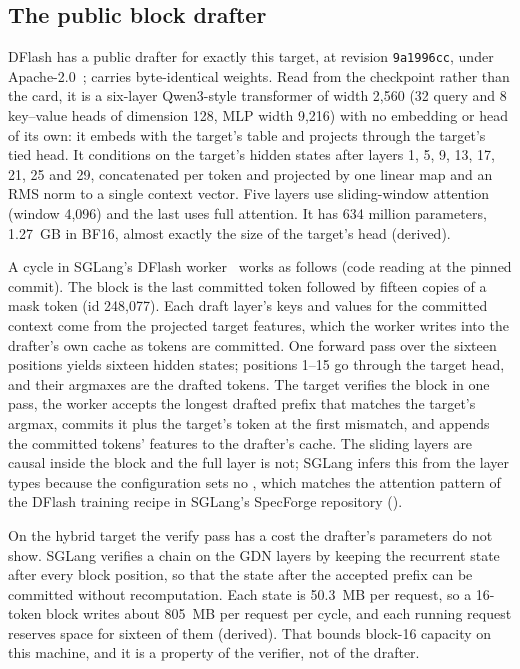 \subsection{The public block drafter}\label{app:drafter-model}\label{sec:drafter-model}
DFlash has a public drafter for exactly this target,  at revision \texttt{9a1996cc}, under Apache-2.0~\cite{dflashpaper,dflash4bcard};  carries byte-identical weights. Read from the checkpoint rather than the card, it is a six-layer Qwen3-style transformer of width 2,560 (32 query and 8 key--value heads of dimension 128, MLP width 9,216) with no embedding or head of its own: it embeds with the target's table and projects through the target's tied head. It conditions on the target's hidden states after layers 1, 5, 9, 13, 17, 21, 25 and 29, concatenated per token and projected by one linear map and an RMS norm to a single context vector. Five layers use sliding-window attention (window 4,096) and the last uses full attention. It has 634 million parameters, 1.27~GB in BF16, almost exactly the size of the target's head (derived).

A cycle in SGLang's DFlash worker~\cite{sgdflashworker,sgcode} works as follows (code reading at the pinned commit). The block is the last committed token followed by fifteen copies of a mask token (id 248,077). Each draft layer's keys and values for the committed context come from the projected target features, which the worker writes into the drafter's own cache as tokens are committed. One forward pass over the sixteen positions yields sixteen hidden states; positions 1--15 go through the target head, and their argmaxes are the drafted tokens. The target verifies the block in one pass, the worker accepts the longest drafted prefix that matches the target's argmax, commits it plus the target's token at the first mismatch, and appends the committed tokens' features to the drafter's cache. The sliding layers are causal inside the block and the full layer is not; SGLang infers this from the layer types because the configuration sets no , which matches the attention pattern of the DFlash training recipe in SGLang's SpecForge repository ().

On the hybrid target the verify pass has a cost the drafter's parameters do not show. SGLang verifies a chain on the GDN layers by keeping the recurrent state after every block position, so that the state after the accepted prefix can be committed without recomputation. Each state is 50.3~MB per request, so a 16-token block writes about 805~MB per request per cycle, and each running request reserves space for sixteen of them (derived). That bounds block-16 capacity on this machine, and it is a property of the verifier, not of the drafter.

